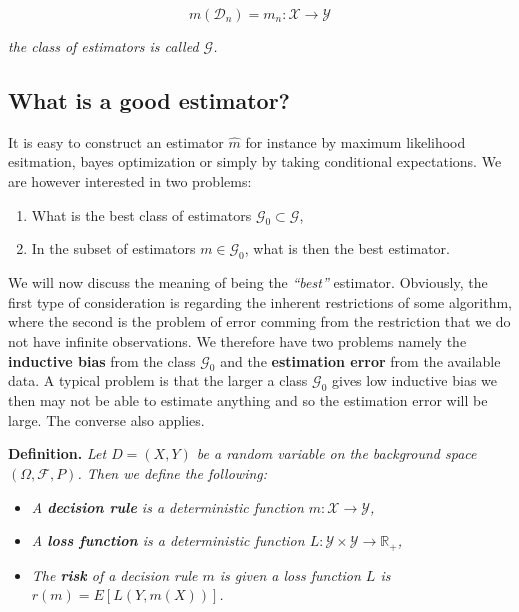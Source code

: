\documentclass[
]{book}
\providecommand{\tightlist}{%
  \setlength{\itemsep}{0pt}\setlength{\parskip}{0pt}}
\begin{document}
\[
m(\mathcal{D}_n)=m_n:\mathcal{X}\to \mathcal{Y}
\]

\emph{the class of estimators is called \(\mathcal{G}\).}

\hypertarget{what-is-a-good-estimator}{%
\subsection{What is a good estimator?}\label{what-is-a-good-estimator}}

It is easy to construct an estimator \(\hat{m}\) for instance by maximum likelihood esitmation, bayes optimization or simply by taking conditional expectations. We are however interested in two problems:

\begin{enumerate}
\def\labelenumi{\arabic{enumi}.}
\tightlist
\item
  What is the best class of estimators \(\mathcal{G}_0\subset\mathcal{G}\),
\item
  In the subset of estimators \(m \in \mathcal{G}_0\), what is then the best estimator.
\end{enumerate}

We will now discuss the meaning of being the \emph{``best''} estimator. Obviously, the first type of consideration is regarding the inherent restrictions of some algorithm, where the second is the problem of error comming from the restriction that we do not have infinite observations. We therefore have two problems namely the \textbf{inductive bias} from the class \(\mathcal{G}_0\) and the \textbf{estimation error} from the available data. A typical problem is that the larger a class \(\mathcal{G}_0\) gives low inductive bias we then may not be able to estimate anything and so the estimation error will be large. The converse also applies.

\textbf{Definition.} \emph{Let \(D=(X,Y)\) be a random variable on the background space \((\Omega, \mathcal{F},P)\). Then we define the following:}

\begin{itemize}
\tightlist
\item
  \emph{A \textbf{decision rule} is a deterministic function \(m:\mathcal{X}\to \mathcal{Y}\),}
\item
  \emph{A \textbf{loss function} is a deterministic function \(L: \mathcal{Y}\times \mathcal{Y}\to \mathbb{R}_+\),}
\item
  \emph{The \textbf{risk} of a decision rule \(m\) is given a loss function \(L\) is \(r(m)=E[L(Y,m(X))]\).}
\end{itemize}
\end{document}
